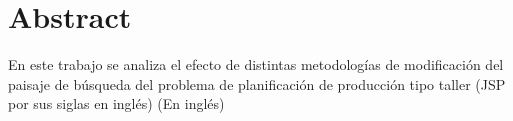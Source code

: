 \chapter*{Abstract}
En este trabajo se analiza el efecto de distintas metodologías de modificación del paisaje de búsqueda del problema de planificación de producción tipo taller (JSP por sus siglas en inglés) (En inglés)

\let\cleardoublepage\clearpage
